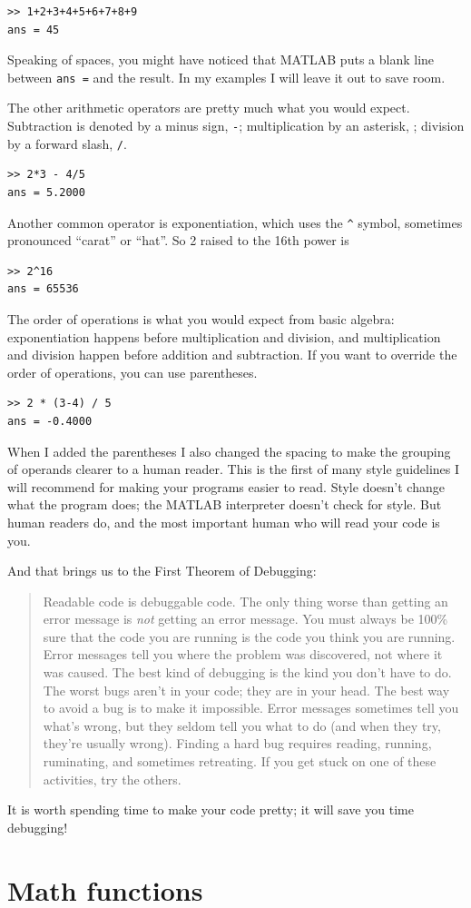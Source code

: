 \documentclass[
]{book}
\newcommand{\displaythrm}[1]{%
    \ifthenelse{\equal{#1}{1}}%
        {Readable code is debuggable code.}{%
    \ifthenelse{\equal{#1}{2}}%
        {The only thing worse than getting an error message is {\em
         not} getting an error message.}{%
    \ifthenelse{\equal{#1}{3}}%
        {You must always be 100\% sure that the code you are running
         is the code you think you are running.}{%
    \ifthenelse{\equal{#1}{4}}%
        {Error messages tell you where the problem was discovered,
         not where it was caused.}{%
    \ifthenelse{\equal{#1}{5}}%
        {The best kind of debugging is the kind you don't have to do.}{%
    \ifthenelse{\equal{#1}{6}}%
        {The worst bugs aren't in your code; they are in your head.}{%
    \ifthenelse{\equal{#1}{7}}%
        {The best way to avoid a bug is to make it impossible.}{%
    \ifthenelse{\equal{#1}{8}}%
        {Error messages sometimes tell you what's wrong, but they
         seldom tell you what to do (and when they try, they're usually
         wrong).}{%
    \ifthenelse{\equal{#1}{9}}%
        {Finding a hard bug requires reading, running, ruminating,
         and sometimes retreating.  If you get stuck on one of these
         activities, try the others.}{%
    {}%
}}}}}}}}}}%
\begin{document}
\begin{verbatim}
>> 1+2+3+4+5+6+7+8+9
ans = 45
\end{verbatim}

Speaking of spaces, you might have noticed that MATLAB puts a blank
line between {\tt ans =} and the result.  In my examples I will leave
it out to save room.

The other arithmetic operators are pretty much what you would expect.
Subtraction is denoted by a minus sign, {\tt -}; multiplication by
an asterisk, {\tt *}; division by a forward slash, {\tt /}.

\begin{verbatim}
>> 2*3 - 4/5
ans = 5.2000
\end{verbatim}

Another common operator is exponentiation, which uses the \verb+^+
symbol, sometimes pronounced ``carat'' or ``hat''.  So 2 raised to the
16th power is

\begin{verbatim}
>> 2^16
ans = 65536
\end{verbatim}

The order of operations is what you would expect from basic algebra:
exponentiation happens before multiplication
and division, and
multiplication and division happen before addition and subtraction.
If you want to override the order of operations, you can use parentheses.

\begin{verbatim}
>> 2 * (3-4) / 5
ans = -0.4000
\end{verbatim}

When I added the parentheses I also changed the spacing to make the
grouping of operands clearer to a human reader.  This is the first
of many style guidelines I will recommend for making your programs
easier to read.  Style doesn't change what the program does; the MATLAB
interpreter doesn't check for style.  But human readers do, and the
most important human who will read your code is you.

And that brings us to the First Theorem of Debugging:

\begin{quote}
\displaythrm{1}
\end{quote}

It is worth spending time to make your code pretty; it will save
you time debugging!


\section{Math functions}
\end{document}

